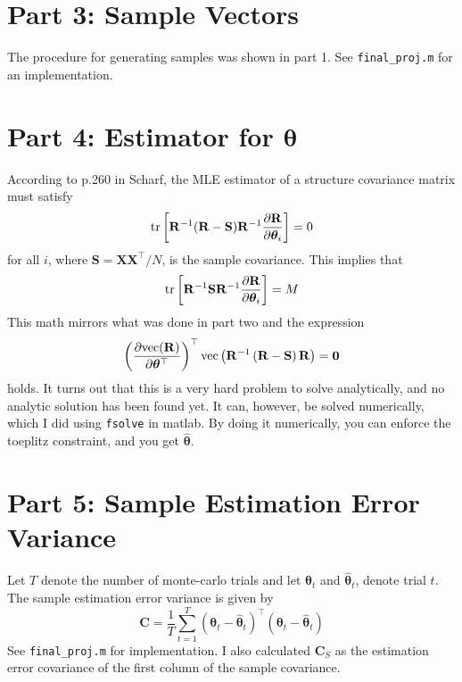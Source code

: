 \documentclass[a4paper]{article}
\begin{document}
  \section*{Part 3: Sample Vectors}%
  The procedure for generating samples was shown in part 1. See \texttt{final\_proj.m} for an implementation.

  \section*{Part 4: Estimator for $\bm{\theta}$}%
  According to p.260 in Scharf, the MLE estimator of a structure covariance matrix must satisfy
  \[
    \tr \left[ \mathbf{R}^{-1}(\mathbf{R} - \mathbf{S})\mathbf{R}^{-1} \pdv{\mathbf{R}}{\bm{\theta}_i} \right] = 0
  \]
  for all $i$, where $\mathbf{S} = \bm{X}\bm{X}^\top/N$, is the sample covariance. This implies that
  \[
    \tr \left[ \mathbf{R}^{-1}\mathbf{S}\mathbf{R}^{-1} \pdv{\mathbf{R}}{\bm{\theta}_i} \right] = M
  \]
  This math mirrors what was done in part two and the expression
  \[
    \left( \pdv{\text{vec}(\mathbf{R})}{\bm{\theta}^\top} \right)^\top \text{vec}\left( \mathbf{R}^{-1} \left( \mathbf{R} - \mathbf{S} \right) \mathbf{R} \right) = \bm{0}
  \]
  holds.  It turns out that this is a very hard problem to solve analytically, and no analytic solution has been found yet. It can, however, be solved numerically, which I did using \texttt{fsolve} in matlab. By doing it numerically, you can enforce the toeplitz constraint, and you get $\hat{\bm{\theta}}$.


  \section*{Part 5: Sample Estimation Error Variance} 
  Let $T$ denote the number of monte-carlo trials and let $\bm{\theta}_t$ and $\hat{\bm{\theta}}_t$, denote trial $t$. The sample estimation error variance is given by
  \[
    \mathbf{C} = \frac{1}{T} \sum_{t=1}^T (\bm{\theta}_t - \hat{\bm{\theta}}_t)^\top (\bm{\theta}_t - \hat{\bm{\theta}}_t)
  \]
  See \texttt{final\_proj.m} for implementation. I also calculated $\mathbf{C}_S$ as the estimation error covariance of the first column of the sample covariance.
\end{document}
